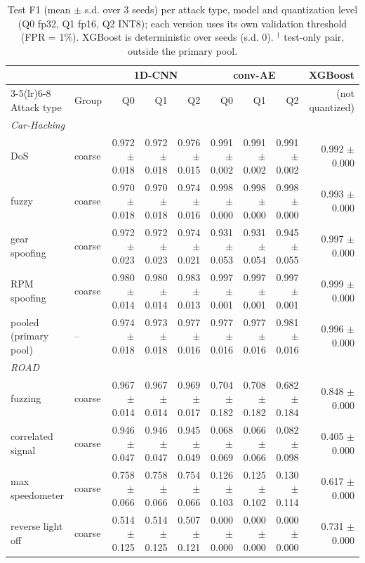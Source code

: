 \begin{table}[t]
\centering
\footnotesize
\caption{Test F1 (mean $\pm$ s.d. over 3 seeds) per attack type, model and quantization level (Q0 fp32, Q1 fp16, Q2 INT8); each version uses its own validation threshold (FPR = 1\%). XGBoost is deterministic over seeds (s.d. 0). $^\dagger$ test-only pair, outside the primary pool.}
\label{tab:f1}
\begin{tabular}{@{}llrrrrrrr@{}}
\toprule
& & \multicolumn{3}{c}{1D-CNN} & \multicolumn{3}{c}{conv-AE} & XGBoost \\
\cmidrule(lr){3-5}\cmidrule(lr){6-8}
Attack type & Group & Q0 & Q1 & Q2 & Q0 & Q1 & Q2 & (not quantized) \\
\midrule
\multicolumn{9}{l}{\textit{Car-Hacking}} \\
DoS & coarse & 0.972 $\pm$ 0.018 & 0.972 $\pm$ 0.018 & 0.976 $\pm$ 0.015 & 0.991 $\pm$ 0.002 & 0.991 $\pm$ 0.002 & 0.991 $\pm$ 0.002 & 0.992 $\pm$ 0.000 \\
fuzzy & coarse & 0.970 $\pm$ 0.018 & 0.970 $\pm$ 0.018 & 0.974 $\pm$ 0.016 & 0.998 $\pm$ 0.000 & 0.998 $\pm$ 0.000 & 0.998 $\pm$ 0.000 & 0.993 $\pm$ 0.000 \\
gear spoofing & coarse & 0.972 $\pm$ 0.023 & 0.972 $\pm$ 0.023 & 0.974 $\pm$ 0.021 & 0.931 $\pm$ 0.053 & 0.931 $\pm$ 0.054 & 0.945 $\pm$ 0.055 & 0.997 $\pm$ 0.000 \\
RPM spoofing & coarse & 0.980 $\pm$ 0.014 & 0.980 $\pm$ 0.014 & 0.983 $\pm$ 0.013 & 0.997 $\pm$ 0.001 & 0.997 $\pm$ 0.001 & 0.997 $\pm$ 0.001 & 0.999 $\pm$ 0.000 \\
pooled (primary pool) & -- & 0.974 $\pm$ 0.018 & 0.973 $\pm$ 0.018 & 0.977 $\pm$ 0.016 & 0.977 $\pm$ 0.016 & 0.977 $\pm$ 0.016 & 0.981 $\pm$ 0.016 & 0.996 $\pm$ 0.000 \\
\midrule
\multicolumn{9}{l}{\textit{ROAD}} \\
fuzzing & coarse & 0.967 $\pm$ 0.014 & 0.967 $\pm$ 0.014 & 0.969 $\pm$ 0.017 & 0.704 $\pm$ 0.182 & 0.708 $\pm$ 0.182 & 0.682 $\pm$ 0.184 & 0.848 $\pm$ 0.000 \\
correlated signal & coarse & 0.946 $\pm$ 0.047 & 0.946 $\pm$ 0.047 & 0.945 $\pm$ 0.049 & 0.068 $\pm$ 0.069 & 0.066 $\pm$ 0.066 & 0.082 $\pm$ 0.098 & 0.405 $\pm$ 0.000 \\
max speedometer & coarse & 0.758 $\pm$ 0.066 & 0.758 $\pm$ 0.066 & 0.754 $\pm$ 0.066 & 0.126 $\pm$ 0.103 & 0.125 $\pm$ 0.102 & 0.130 $\pm$ 0.114 & 0.617 $\pm$ 0.000 \\
reverse light off & coarse & 0.514 $\pm$ 0.125 & 0.514 $\pm$ 0.125 & 0.507 $\pm$ 0.121 & 0.000 $\pm$ 0.000 & 0.000 $\pm$ 0.000 & 0.000 $\pm$ 0.000 & 0.731 $\pm$ 0.000 \\

\end{tabular}
\end{table}
